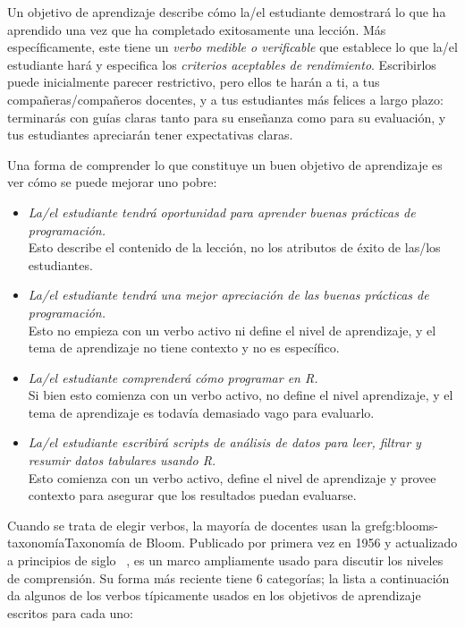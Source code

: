 Un objetivo de aprendizaje describe cómo la/el estudiante demostrará lo que ha aprendido
una vez que ha completado exitosamente una lección.
Más específicamente,
este tiene un \emph{verbo medible o verificable} que establece lo que la/el estudiante hará
y especifica los \emph{criterios aceptables de rendimiento}.
Escribirlos puede inicialmente parecer restrictivo,
pero ellos te harán a ti,
a tus compañeras/compañeros docentes,
y a tus estudiantes más felices a largo plazo:
terminarás con guías claras tanto para su enseñanza como para su evaluación,
y tus estudiantes apreciarán tener expectativas claras.

Una forma de comprender lo que constituye un buen objetivo de aprendizaje
es ver cómo se puede mejorar uno pobre:

 \begin{itemize}
 
\item
  \emph{La/el estudiante tendrá oportunidad para aprender buenas prácticas de programación.}\\
Esto describe el contenido de la lección,
no los atributos de éxito de las/los estudiantes.\\
 
\item
  \emph{La/el estudiante tendrá una mejor apreciación
de las buenas prácticas de programación.}\\
 Esto no empieza con un verbo activo ni define el nivel de aprendizaje,
y el tema de aprendizaje no tiene contexto y no es específico.\\
 
\item
  \emph{La/el estudiante comprenderá cómo programar en R.}\\
  Si bien esto comienza con un verbo activo,
   no define el nivel aprendizaje, 
  y el tema de aprendizaje es todavía demasiado vago para evaluarlo.\\
 
\item
  \emph{La/el estudiante escribirá scripts de análisis de datos para leer, filtrar y resumir datos tabulares usando R.}\\
 Esto comienza con un verbo activo,
define el nivel de aprendizaje
y provee contexto para asegurar que los resultados puedan evaluarse.
\end{itemize}
 
Cuando se trata de elegir verbos,
la mayoría de docentes usan la gref{g:blooms-taxonomía}{Taxonomía de Bloom}.
Publicado por primera vez en 1956 y actualizado a principios de siglo ~\cite{Ande2001},
es un marco ampliamente usado para discutir los niveles de comprensión.
Su forma más reciente tiene 6 categorías;
la lista a continuación da algunos de los verbos típicamente usados en los objetivos de aprendizaje escritos para cada uno:


